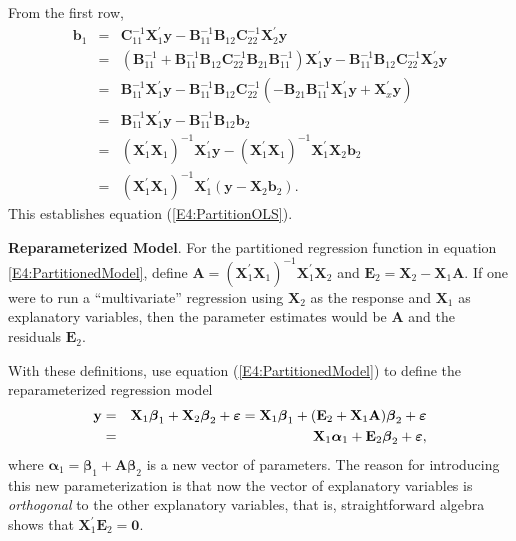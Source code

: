 From the first row,
\begin{eqnarray*}
\mathbf{b}_1 &=& \mathbf{C}_{11}^{-1}
\mathbf{X}_1^{\prime}\mathbf{y} -
\mathbf{B}_{11}^{-1}\mathbf{B}_{12}\mathbf{C}_{22}^{-1}
\mathbf{X}_2^{\prime}\mathbf{y} \\
&=& \left( \mathbf{B}_{11}^{-1} + \mathbf{B}_{11}^{-1}
\mathbf{B}_{12} \mathbf{C}_{22}^{-1} \mathbf{B}_{21}
\mathbf{B}_{11}^{-1} \right) \mathbf{X}_1^{\prime}\mathbf{y} -
\mathbf{B}_{11}^{-1}\mathbf{B}_{12}\mathbf{C}_{22}^{-1}
\mathbf{X}_2^{\prime}\mathbf{y} \\
&=& \mathbf{B}_{11}^{-1}\mathbf{X}_1^{\prime}\mathbf{y} -
\mathbf{B}_{11}^{-1} \mathbf{B}_{12} \mathbf{C}_{22}^{-1} \left(
-\mathbf{B}_{21} \mathbf{B}_{11}^{-1} \mathbf{X}_1^{\prime}\mathbf{y} +
\mathbf{X}_x^{\prime}\mathbf{y}
\right) \\
&=& \mathbf{B}_{11}^{-1}\mathbf{X}_1^{\prime}\mathbf{y} -
\mathbf{B}_{11}^{-1} \mathbf{B}_{12} \mathbf{b}_2\\
&=& (\mathbf{X}_1^{\prime}\mathbf{X}_1)^{-1}\mathbf{X}_1^{\prime}\mathbf{y} -
(\mathbf{X}_1^{\prime}\mathbf{X}_1)^{-1} \mathbf{X}_1^{\prime}\mathbf{X}_2 \mathbf{b}_2\\
&=& (\mathbf{X}_1^{\prime}\mathbf{X}_1)^{-1}\mathbf{X}_1^{\prime}
\left(
\mathbf{y} - \mathbf{X}_2 \mathbf{b}_2
\right) .
\end{eqnarray*}
This establishes equation (\ref{E4:PartitionOLS}).


\textbf{Reparameterized Model}. For the partitioned regression
function in equation \ref{E4:PartitionedModel}, define $\mathbf{A}=
\left( \mathbf{X}_1^{\prime} \mathbf{X}_1 \right)^{-1}
\mathbf{X}_1^{\prime} \mathbf{X}_2$ and $\mathbf{E}_2 = \mathbf{X}_2
- \mathbf{X}_1 \mathbf{A}$. If one were to run a ``multivariate''
regression using $\mathbf{X}_2$ as the response and $\mathbf{X}_1$
as explanatory variables, then the parameter estimates would be
$\mathbf{A}$ and the residuals $\mathbf{E}_2$.

With these definitions, use equation (\ref{E4:PartitionedModel}) to
define the reparameterized regression model
\begin{eqnarray}\label{E4:OVEquation}
\mathbf{y} &=& \mathbf{X}_1 \boldsymbol \beta _1 + \mathbf{X}_2
\boldsymbol \beta _2 + \boldsymbol \varepsilon = \mathbf{X}_1
\boldsymbol \beta _1 + (\mathbf{E}_2 + \mathbf{X}_1
\mathbf{A})\boldsymbol \beta _2 + \boldsymbol \varepsilon \notag \\
&=& \mathbf{X}_1 \boldsymbol \alpha _1 + \mathbf{E}_2 \boldsymbol
\beta _2 + \boldsymbol \varepsilon,
\end{eqnarray}
where $\boldsymbol \alpha _1 = \boldsymbol \beta _1 +
\mathbf{A}\boldsymbol \beta _2 $ is a new vector of parameters. The
reason for introducing this new parameterization is that now the
vector of explanatory variables is \textit{orthogonal} to the other
explanatory variables, that is, straightforward algebra shows that
$\mathbf{X}_1^{\prime }\mathbf{E}_2=\mathbf{0}$.

